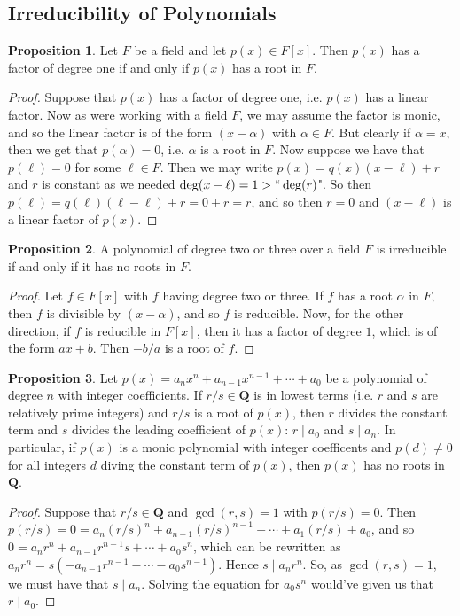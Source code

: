 \documentclass[9pt,reqno]{amsart}
\theoremstyle{definition}
\newtheorem{prop}{Proposition}[section]
\newcommand{\qq}{\mathbf Q}
\begin{document}
\subsection{Irreducibility of Polynomials}

\begin{prop}
Let $F$ be a field and let $p(x) \in F[x]$. Then $p(x)$ has a factor of degree one if and only if $p(x)$ has a root in $F$.
\end{prop}
\begin{proof}
	Suppose that $p(x)$ has a factor of degree one, i.e. $p(x)$ has a linear factor. Now as were working with a field $F$, we may assume the factor is monic, and so the linear factor is of the form $(x- \alpha )$ with $\alpha \in F$. But clearly if $\alpha = x$, then we get that $p( \alpha ) = 0$, i.e. $\alpha$ is a root in $F$. Now suppose we have that $p (\ell ) = 0$ for some $\ell \in F$. Then we may write $p(x) = q(x)(x-\ell) + r$ and $r$ is constant as we needed $\deg (x - \ell ) = 1 > ``\deg (r)$". So then $p (\ell) = q(\ell) (\ell- \ell) + r = 0 +r = r$, and so then $r = 0 $ and $(x-\ell)$ is a linear factor of $p(x)$. 
\end{proof}	
\begin{prop}A polynomial of degree two or three over a field $F$ is irreducible if and only if it has no roots in $F$.
\end{prop}
\begin{proof}
	Let $f \in F[x]$ with $f$ having degree two or three. If $f$ has a root $\alpha$ in $F$, then $f$ is divisible by $(x-\alpha)$, and so $f$ is reducible. Now, for the other direction, if $f$ is reducible in $F[x]$, then it has a factor of degree $1$, which is of the form $ax+b$. Then $-b/a$ is a root of $f$. 
\end{proof}
\begin{prop}
Let $p(x) = a_n x^n + a_{n-1} x^{n-1} + \cdots + a_0$ be a polynomial of degree $n$ with integer coefficients. If $r/s \in \qq$ is in lowest terms (i.e. $r$ and $s$ are relatively prime integers) and $r/s$ is a root of $p(x)$, then $r$ divides the constant term and $s$ divides the leading coefficient of $p(x)$:  $r \mid a_0$ and $s \mid a_n$. In particular, if $p(x)$ is a monic polynomial with integer coefficents and $p(d) \neq 0$ for all integers $d$ diving the constant term of $p(x)$, then $p(x)$ has no roots in $\qq$. 
\end{prop}
\begin{proof} Suppose that $r/s \in \qq$ and $\gcd (r, s) = 1$ with $p(r/s) = 0$. Then 
	$p(r/s) = 0 = a_n (r/s)^n + a_{n-1} (r/s)^{n-1} + \cdots + a_1 (r/s) + a_0$, and so $ 0 = a_n r^n +a_{n-1} r^{n-1}s  + \cdots + a_0 s^n$, which can be rewritten as $a_n r^n = s(-a_{n-1} r^{n-1}  - \cdots - a_0 s^{n-1})$. Hence $s \mid a_n r^n$. So, as $\gcd (r,s) = 1$, we must have that $s \mid a_n$. Solving the equation for $a_0 s^n$ would've given us that $ r \mid a_0$. 
\end{proof}
\end{document}
